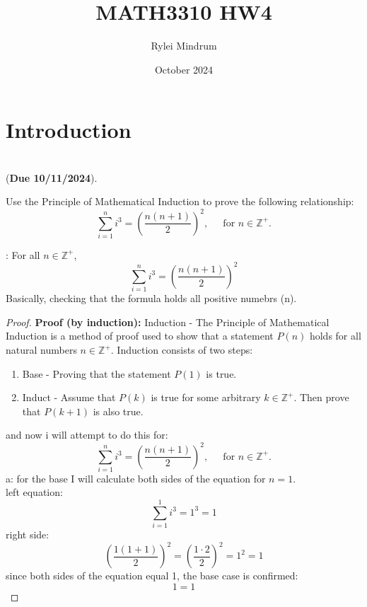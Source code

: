 \documentclass[10pt, AMS Euler]{article}
\title{MATH3310 HW4}
\author{Rylei Mindrum}
\date{October 2024}
\newcommand{\Z}{\mathbb{Z}}
\begin{document}
\maketitle

\section{Introduction}
	\noindent \underline{\hspace{3in}}\\
	 ({\bf Due 10/11/2024}).\\
	
	\begin{enumerate}
		
		\item Use the Principle of Mathematical Induction to prove the following relationship:
		$$\sum_{i=1}^n i^3 = \left(\frac{n(n+1)}{2}\right)^2, \;\;\;\; \mbox{ for } n \in \Z^+.$$
            \item[\bf{Claim}]: For all $n \in \mathbb{Z}^+$,
                    \[
                    \sum_{i=1}^n i^3 = \left( \frac{n(n+1)}{2} \right)^2
                    \]
                    Basically, checking that the formula holds all positive numebrs (n). 
            \begin{proof}
                \item[\bf{Proof}:]
                    \noindent\textbf{Proof (by induction):} 
                    \noindent Induction - The Principle of Mathematical Induction is a method of proof used to show that a statement $P(n)$ holds for all natural numbers $n \in \mathbb{Z}^+$. Induction consists of two steps:
                    \begin{enumerate}
                        \item Base - Proving that the statement $P(1)$ is true.
                        \item Induct -  Assume that $P(k)$ is true for some arbitrary $k \in \mathbb{Z}^+$. Then prove that $P(k+1)$ is also true.
                    \end{enumerate}
                    and now i will attempt to do this for:
                    \[
                    \sum_{i=1}^n i^3 = \left(\frac{n(n+1)}{2}\right)^2, \;\;\;\; \mbox{ for } n \in \mathbb{Z}^+.
                    \]
                    a: for the base I will calculate both sides of the equation for $n=1$. \\ left equation:
                    \[
                    \sum_{i=1}^1 i^3 = 1^3 = 1
                    \]
                    right side:  
                    \[
                    \left( \frac{1(1+1)}{2} \right)^2 = \left( \frac{1 \cdot 2}{2} \right)^2 = 1^2 = 1
                    \]
                    since both sides of the equation equal 1, the base case is confirmed: 
                    \[
                    1 = 1
                    \]
                    

\end{proof}
\end{enumerate}
\end{document}
